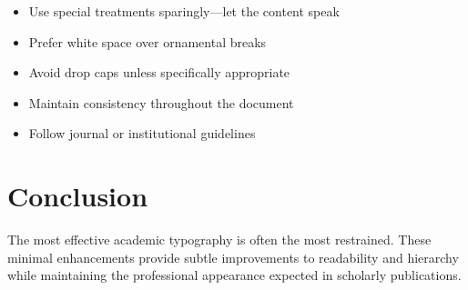\documentclass[11pt]{article}
\begin{document}
\begin{itemize}
\item Use special treatments sparingly—let the content speak
\item Prefer white space over ornamental breaks
\item Avoid drop caps unless specifically appropriate
\item Maintain consistency throughout the document
\item Follow journal or institutional guidelines
\end{itemize}

\section{Conclusion}

The most effective academic typography is often the most restrained. These minimal enhancements provide subtle improvements to readability and hierarchy while maintaining the professional appearance expected in scholarly publications.
\end{document}
